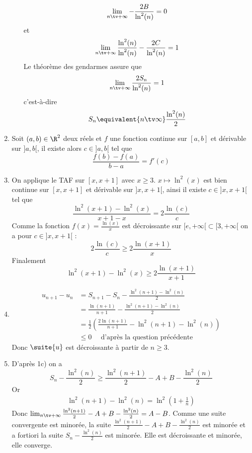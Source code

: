 \begin{correction}
\begin{enumerate}
\begin{enumerate}
$$\lim_{n\tv +\infty}-\frac{2B}{\ln^2(n)} = 0$$
et
$$\lim_{n\tv +\infty} \frac{\ln^2(n)}{\ln^2(n)} -\frac{2C}{\ln^2(n)}= 1$$
Le théorème des gendarmes assure que 
$$\lim_{n\tv +\infty}  \frac{2S_n}{\ln^2(n)}=1$$
c'est-à-dire $$S_n  \equivalent{n\tv \infty} \frac{\ln^2(n)}{2}$$
\end{enumerate}
\item Soit $(a,b) \in \R^2$ deux réels et $f $ une fonction continue sur $[a,b]$ et dérivable sur $]a, b[$, il existe alors $c\in ]a, b[$ tel que 
$$\frac{f(b)-f(a)}{b-a} =f'(c)$$
\item On applique le TAF sur $[x,x+1]$ avec $x\geq 3$. $x\mapsto \ln^2(x)$ est bien continue sur $[x,x+1]$ et dérivable sur $]x, x+1[$, ainsi il existe $c\in ]x, x+1[$ tel que 
$$\frac{\ln^2(x+1)-\ln^2(x)}{x+1-x} =2\frac{\ln(c)}{c}$$
Comme la fonction $f(x) =\frac{\ln(x)}{x}$ est décroissante sur $[e, +\infty[\subset [3, +\infty[$ on a pour $c\in ]x,x+1[$ :
$$2\frac{\ln(c)}{c} \geq 2\frac{\ln(x+1)}{x}$$
Finalement 
$$\ln^2(x+1)-\ln^2(x) \geq 2\frac{\ln(x+1)}{x+1}$$
\item
\begin{align*}
 u_{n+1}-u_n &= S_{n+1} -S_n -\frac{\ln^2(n+1)-\ln^2(n)}{2}\\
 					&= \frac{\ln(n+1)}{n+1}- \frac{\ln^2(n+1)-\ln^2(n)}{2}\\
 					&= \frac{1}{2} \left(  \frac{2\ln(n+1)}{n+1}- \ln^2(n+1)-\ln^2(n)  \right)\\
 					&\leq 0\quad \text{ d'après la question précédente}
\end{align*}
Donc $\suite{u}$ est décroissante à partir de $n\geq 3$. 
\item D'après 1c) on  a
$$S_n -\frac{\ln^2(n)}{2 }\geq \frac{\ln^2(n+1) }{2} - A +B -\frac{\ln^2(n)}{2 }$$
Or 
\begin{align*}
\ln^2(n+1)-\ln^2(n) =\ln^2\left(1+\frac{1}{n}\right)
\end{align*}
Donc $\lim_{n\tv +\infty }  \frac{\ln^2(n+1) }{2} - A +B -\frac{\ln^2(n)}{2 } = A-B$. Comme une suite convergente est minorée, la suite $ \frac{\ln^2(n+1) }{2} - A +B -\frac{\ln^2(n)}{2 }$ est minorée et a fortiori la suite $S_n -\frac{\ln^2(n)}{2 }$ est minorée. Elle est décroissante et minorée, elle converge. 


\end{enumerate}
\end{correction}



